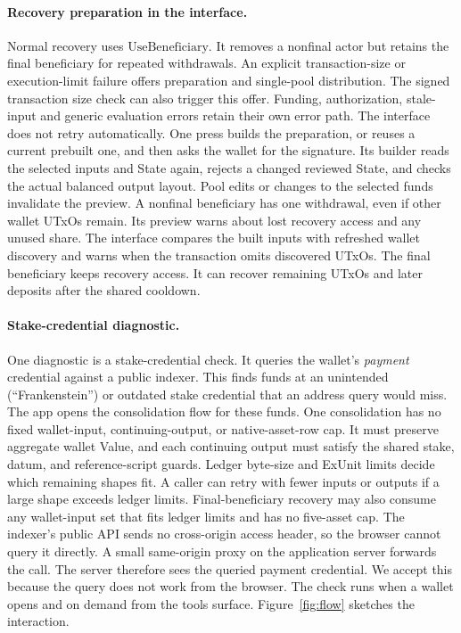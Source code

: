 \documentclass[11pt,DIV=11,parskip=half-]{scrartcl}
\begin{document}
\paragraph{Recovery preparation in the interface.} Normal recovery uses $\mathrm{UseBeneficiary}$. It removes a nonfinal actor but retains the final beneficiary for repeated withdrawals. An explicit transaction-size or execution-limit failure offers preparation and single-pool distribution. The signed transaction size check can also trigger this offer. Funding, authorization, stale-input and generic evaluation errors retain their own error path. The interface does not retry automatically. One press builds the preparation, or reuses a current prebuilt one, and then asks the wallet for the signature. Its builder reads the selected inputs and State again, rejects a changed reviewed State, and checks the actual balanced output layout. Pool edits or changes to the selected funds invalidate the preview. A nonfinal beneficiary has one withdrawal, even if other wallet UTxOs remain. Its preview warns about lost recovery access and any unused share. The interface compares the built inputs with refreshed wallet discovery and warns when the transaction omits discovered UTxOs. The final beneficiary keeps recovery access. It can recover remaining UTxOs and later deposits after the shared cooldown.

\paragraph{Stake-credential diagnostic.} One diagnostic is a stake-credential check. It queries the wallet's \emph{payment} credential against a public indexer. This finds funds at an unintended (``Frankenstein'') or outdated stake credential that an address query would miss. The app opens the consolidation flow for these funds. One consolidation has no fixed wallet-input, continuing-output, or native-asset-row cap. It must preserve aggregate wallet Value, and each continuing output must satisfy the shared stake, datum, and reference-script guards. Ledger byte-size and ExUnit limits decide which remaining shapes fit. A caller can retry with fewer inputs or outputs if a large shape exceeds ledger limits. Final-beneficiary recovery may also consume any wallet-input set that fits ledger limits and has no five-asset cap. The indexer's public API sends no cross-origin access header, so the browser cannot query it directly. A small same-origin proxy on the application server forwards the call. The server therefore sees the queried payment credential. We accept this because the query does not work from the browser. The check runs when a wallet opens and on demand from the tools surface. Figure~\ref{fig:flow} sketches the interaction.
\end{document}
